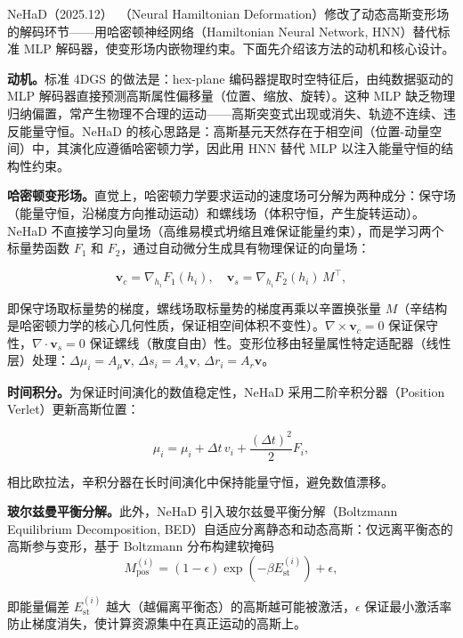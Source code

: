 NeHaD（2025.12）~\cite{2512_10424}（Neural Hamiltonian Deformation）修改了动态高斯变形场的解码环节——用哈密顿神经网络（Hamiltonian Neural Network, HNN）替代标准 MLP 解码器，使变形场内嵌物理约束。下面先介绍该方法的动机和核心设计。

\textbf{动机。}标准 4DGS 的做法是：hex-plane 编码器提取时空特征后，由纯数据驱动的 MLP 解码器直接预测高斯属性偏移量（位置、缩放、旋转）。这种 MLP 缺乏物理归纳偏置，常产生物理不合理的运动——高斯突变式出现或消失、轨迹不连续、违反能量守恒。NeHaD 的核心思路是：高斯基元天然存在于相空间（位置-动量空间）中，其演化应遵循哈密顿力学，因此用 HNN 替代 MLP 以注入能量守恒的结构性约束。

\textbf{哈密顿变形场。}直觉上，哈密顿力学要求运动的速度场可分解为两种成分：保守场（能量守恒，沿梯度方向推动运动）和螺线场（体积守恒，产生旋转运动）。NeHaD 不直接学习向量场（高维易模式坍缩且难保证能量约束），而是学习两个标量势函数 $F_1$ 和 $F_2$，通过自动微分生成具有物理保证的向量场：

\begin{equation}
\mathbf{v}_c = \nabla_{h_i} F_1(h_i), \quad \mathbf{v}_s = \nabla_{h_i} F_2(h_i) \, M^\top,
\end{equation}

即保守场取标量势的梯度，螺线场取标量势的梯度再乘以辛置换张量 $M$（辛结构是哈密顿力学的核心几何性质，保证相空间体积不变性）。$\nabla \times \mathbf{v}_c = 0$ 保证保守性，$\nabla \cdot \mathbf{v}_s = 0$ 保证螺线（散度自由）性。变形位移由轻量属性特定适配器（线性层）处理：$\Delta\mu_i = A_\mu \mathbf{v}$, $\Delta s_i = A_s \mathbf{v}$, $\Delta r_i = A_r \mathbf{v}$。

\textbf{时间积分。}为保证时间演化的数值稳定性，NeHaD 采用二阶辛积分器（Position Verlet）更新高斯位置：

\begin{equation}
\mu_i = \mu_i + \Delta t \, v_i + \frac{(\Delta t)^2}{2} F_i,
\end{equation}

相比欧拉法，辛积分器在长时间演化中保持能量守恒，避免数值漂移。

\textbf{玻尔兹曼平衡分解。}此外，NeHaD 引入玻尔兹曼平衡分解（Boltzmann Equilibrium Decomposition, BED）自适应分离静态和动态高斯：仅远离平衡态的高斯参与变形，基于 Boltzmann 分布构建软掩码
\begin{equation}
M_{\text{pos}}^{(i)} = (1-\epsilon) \exp(-\beta E_{\text{st}}^{(i)}) + \epsilon,
\end{equation}

即能量偏差 $E_{\text{st}}^{(i)}$ 越大（越偏离平衡态）的高斯越可能被激活，$\epsilon$ 保证最小激活率防止梯度消失，使计算资源集中在真正运动的高斯上。

